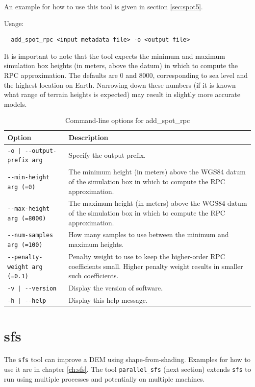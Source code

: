 An example for how to use this tool is given in section \ref{sec:spot5}.


Usage:
\begin{verbatim}
  add_spot_rpc <input metadata file> -o <output file>
\end{verbatim}

It is important to note that the tool expects the minimum and maximum
simulation box heights (in meters, above the datum) in which to compute
the RPC approximation. The defaults are 0 and 8000, corresponding to sea
level and the highest location on Earth. Narrowing down these numbers
(if it is known what range of terrain heights is expected) may result in
slightly more accurate models.

\begin{longtable}{|l|p{7.5cm}|}
\caption{Command-line options for add\_spot\_rpc}
\label{tbl:addspotrpc}
\endfirsthead
\endhead
\endfoot
\endlastfoot
\hline
Option & Description \\ \hline \hline
\texttt{-o | -\/-output-prefix  arg} & Specify the output prefix.\\ \hline
\texttt{-\/-min-height arg (=0)} & The minimum height (in meters) above the WGS84 datum of the simulation box in which to compute the RPC approximation.\\ \hline
\texttt{-\/-max-height arg (=8000)} & The maximum height (in meters) above the WGS84 datum of the simulation box in which to compute the RPC approximation.\\ \hline
\texttt{-\/-num-samples arg (=100)} & How many samples to use between the minimum and maximum heights.\\ \hline
\texttt{-\/-penalty-weight arg (=0.1)} & Penalty weight to use to keep the higher-order RPC coefficients small. Higher penalty weight results in smaller such coefficients.\\ \hline
\texttt{-v | -\/-version } & Display the version of software.\\ \hline
\texttt{-h | -\/-help } & Display this help message.\\ \hline
\end{longtable}


\section{sfs}
\label{sfs}

The \texttt{sfs} tool can improve a DEM using
shape-from-shading. Examples for how to use it are in chapter
\ref{ch:sfs}. The tool \texttt{parallel\_sfs} (next section) extends
\texttt{sfs} to run using multiple processes and potentially on multiple
machines.

